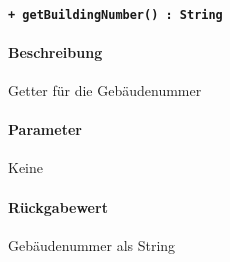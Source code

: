\paragraph{\texttt{+ getBuildingNumber() : String}}\label{AP_Alias_getBuildingNumber}%
\paragraph*{Beschreibung}
Getter für die Gebäudenummer
\paragraph*{Parameter}
Keine
\paragraph*{Rückgabewert}
Gebäudenummer als String